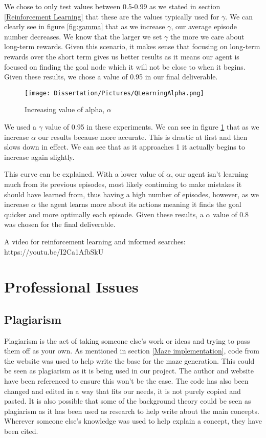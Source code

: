 \documentclass[]{final_report}
\begin{document}
We chose to only test values between 0.5-0.99 as we stated in section \ref{Reinforcement Learning} that these are the values typically used for $\gamma$. We can clearly see in figure \ref{fig:gamma} that as we increase $\gamma$, our average episode number decreases. We know that the larger we set $\gamma$ the more we care about long-term rewards. Given this scenario, it makes sense that focusing on long-term rewards over the short term gives us better results as it means our agent is focused on finding the goal node which it will not be close to when it begins. Given these results, we chose a value of 0.95 in our final deliverable.

\newpage
\begin{figure}[!htp]
    \centering
    \texttt{[image: Dissertation/Pictures/QLearningAlpha.png]}
    \caption{Increasing value of alpha, $\alpha$}
    \label{fig:alpha}
\end{figure}

 We used a $\gamma$ value of 0.95 in these experiments. We can see in figure \ref{fig:alpha} that as we increase $\alpha$ our results because more accurate. This is drastic at first and then slows down in effect. We can see that as it approaches 1 it actually begins to increase again slightly. 

This curve can be explained. With a lower value of $\alpha$, our agent isn't learning much from its previous episodes, most likely continuing to make mistakes it should have learned from, thus having a high number of episodes, however, as we increase $\alpha$ the agent learns more about its actions meaning it finds the goal quicker  and more optimally each episode. Given these results, a $\alpha$ value of 0.8 was chosen for the final deliverable.

A video for reinforcement learning and informed searches: https://youtu.be/I2Ca1AfbSkU

\chapter{Professional Issues}  

\section{Plagiarism}

Plagiarism is the act of taking someone else's work or ideas and trying to pass them off as your own. As mentioned in section \ref{Maze implementation}, code from the website \cite{maze} was used to help write the base for the maze generation. This could be seen as plagiarism as it is being used in our project. The author and website have been referenced to ensure this won't be the case. The code has also been changed and edited in a way that fits our needs, it is not purely copied and pasted. It is also possible that some of the background theory could be seen as plagiarism as it has been used as research to help write about the main concepts. Wherever someone else's knowledge was used to help explain a concept, they have been cited.
\end{document}
